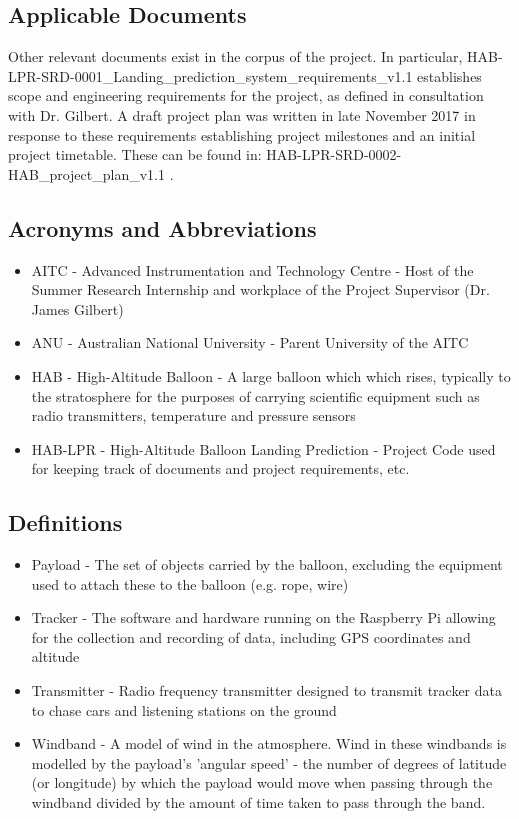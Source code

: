 \documentclass[11pt]{article}
\begin{document}
\subsection{Applicable Documents}
Other relevant documents exist in the corpus of the project. In particular, HAB-LPR-SRD-0001\_Landing\_prediction\_system\_requirements\_v1.1 establishes scope and engineering requirements for the project, as defined in consultation with Dr. Gilbert. A draft project plan was written in late November 2017 in response to these requirements establishing project milestones and an initial project timetable. These can be found in: HAB-LPR-SRD-0002-HAB\_project\_plan\_v1.1 .

\subsection{Acronyms and Abbreviations}

\begin{itemize}
\item AITC - Advanced Instrumentation and Technology Centre - Host of the Summer Research Internship and workplace of the Project Supervisor (Dr. James Gilbert)
\item ANU - Australian National University - Parent University of the AITC
\item HAB - High-Altitude Balloon - A large balloon which which rises, typically to the stratosphere for the purposes of carrying scientific equipment such as radio transmitters, temperature and pressure sensors
\item HAB-LPR - High-Altitude Balloon Landing Prediction - Project Code used for keeping track of documents and project requirements, etc.
\end{itemize}

\subsection{Definitions}

\begin{itemize}
\item Payload - The set of objects carried by the balloon, excluding the equipment used to attach these to the balloon (e.g. rope, wire)
\item Tracker - The software and hardware running on the Raspberry Pi allowing for the collection and recording of data, including GPS coordinates and altitude
\item Transmitter - Radio frequency transmitter designed to transmit tracker data to chase cars and listening stations on the ground
\item Windband - A model of wind in the atmosphere. Wind in these windbands is modelled by the payload's 'angular speed' - the number of degrees of latitude (or longitude) by which the payload would move when passing through the windband divided by the amount of time taken to pass through the band. 
\end{itemize}
\end{document}

